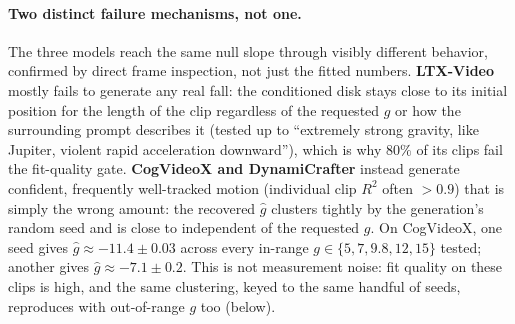\begin{center}
\renewcommand{\arraystretch}{1.2}
\label{tab:e0e1}
\end{center}

\paragraph{Two distinct failure mechanisms, not one.}
The three models reach the same null slope through visibly different
behavior, confirmed by direct frame inspection, not just the fitted numbers.
\textbf{LTX-Video} mostly fails to generate any real fall: the conditioned
disk stays close to its initial position for the length of the clip
regardless of the requested $g$ or how the surrounding prompt describes it
(tested up to ``extremely strong gravity, like Jupiter, violent rapid
acceleration downward''), which is why $80\%$ of its clips fail the
fit-quality gate. \textbf{CogVideoX and DynamiCrafter} instead generate
confident, frequently well-tracked motion (individual clip $R^2$ often
$>0.9$) that is simply the wrong amount: the recovered $\hat g$ clusters
tightly by the generation's random seed and is close to independent of the
requested $g$. On CogVideoX, one seed gives $\hat g \approx -11.4 \pm 0.03$
across every in-range $g\in\{5,7,9.8,12,15\}$ tested; another gives
$\hat g\approx -7.1\pm0.2$. This is not measurement noise: fit quality on
these clips is high, and the same clustering, keyed to the same handful of
seeds, reproduces with out-of-range $g$ too (below).

